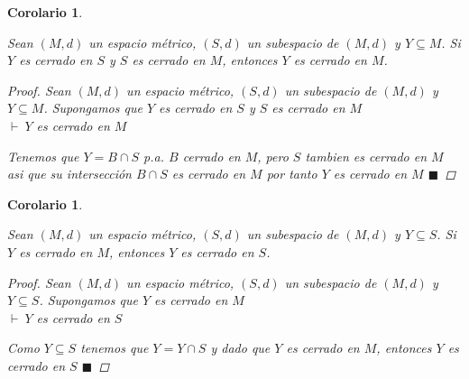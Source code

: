 \documentclass[oneside]{book} %
\theoremstyle{Teorema}
\newtheorem{Corolario}[Definicion]{Corolario}
\theoremstyle{Ejemplos}
\theoremstyle{[Obs]}
\renewcommand{\{}{\left\lbrace} %
\renewcommand{\}}{\right\rbrace} %
\newcommand{\n}{\cap} %
\renewcommand{\sc}{\subseteq} %
\renewcommand{\qed}{$\blacksquare$} %
\newcommand{\pd}{$\vdash\ $} %
\begin{document}
			\begin{Corolario}\label{Corolario: Cerrado en un cerrado es cerrado}\setlength{\parindent}{0em}
			
				Sean $(M, d)$ un espacio métrico, $(S, d)$ un subespacio de $(M, d)$ y $Y \sc M$. Si $Y$ es cerrado en $S$ y $S$ es cerrado en $M$, entonces $Y$ es cerrado en $M$.

				\begin{proof}
					
					Sean $(M, d)$ un espacio métrico, $(S, d)$ un subespacio de $(M, d)$ y $Y \sc M$. Supongamos que $Y$ es cerrado en $S$ y $S$ es cerrado en $M$ \\
					\pd $Y$ es cerrado en $M$

					Tenemos que $Y = B \n S$ p.a. $B$ cerrado en $M$, pero $S$ tambien es cerrado en $M$ asi que su intersección $B \n S$ es cerrado en $M$ por tanto $Y$ es cerrado en $M$ \qed

				\end{proof}
			
			\end{Corolario}

			\begin{Corolario}\label{Corolario: Si es cerrado en el grande entonces es cerrado en el chico}\setlength{\parindent}{0em}
			
				Sean $(M, d)$ un espacio métrico, $(S, d)$ un subespacio de $(M, d)$ y $Y \sc S$. Si $Y$ es cerrado en $M$, entonces $Y$ es cerrado en $S$. 

				\begin{proof}
					
					Sean $(M, d)$ un espacio métrico, $(S, d)$ un subespacio de $(M, d)$ y $Y \sc S$. Supongamos que $Y$ es cerrado en $M$ \\ 
					\pd $Y$ es cerrado en $S$ 

					Como $Y \sc S$ tenemos que $Y = Y \n S$ y dado que $Y$ es cerrado en $M$, entonces $Y$ es cerrado en $S$ \qed

				\end{proof}
			
			\end{Corolario}
\end{document}
